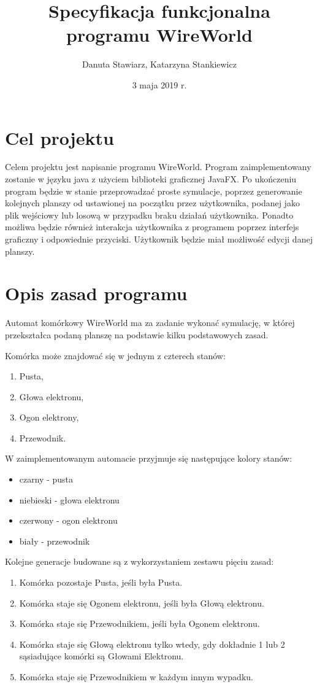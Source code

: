 \documentclass[10pt, oneside]{article}
\title{Specyfikacja funkcjonalna programu WireWorld}
\author{Danuta Stawiarz, Katarzyna Stankiewicz}
\date{3 maja 2019 r.}
\begin{document}
\maketitle
\tableofcontents
\newpage	

\section{Cel projektu}

Celem projektu jest napisanie programu WireWorld. Program zaimplementowany zostanie w języku java z użyciem biblioteki graficznej JavaFX. Po ukończeniu program będzie w stanie przeprowadzać proste symulacje, poprzez generowanie kolejnych planszy od ustawionej na początku przez użytkownika, podanej jako plik wejściowy lub losową w przypadku braku działań użytkownika. Ponadto możliwa będzie również interakcja użytkownika z programem poprzez interfejs graficzny i odpowiednie przyciski. Użytkownik będzie miał możliwość edycji danej planszy. 

\section{Opis zasad programu}

Automat komórkowy WireWorld ma za zadanie wykonać symulację, w której przekształca podaną planszę na podstawie kilku podstawowych zasad.

 Komórka może znajdować się w jednym z czterech stanów:

\begin{enumerate}
\item Pusta,
\item Głowa elektronu,
\item Ogon elektrony,
\item Przewodnik.
\end{enumerate}

W zaimplementowanym automacie przyjmuje się następujące kolory stanów:
\begin{itemize}
\item czarny - pusta
\item niebieski - głowa elektronu
\item czerwony - ogon elektronu
\item biały - przewodnik
\end{itemize}


Kolejne generacje budowane są z wykorzystaniem zestawu pięciu zasad:
\begin{enumerate}
\item Komórka pozostaje Pusta, jeśli była Pusta.
\item Komórka staje się Ogonem elektronu, jeśli była Głową elektronu.
\item Komórka staje się Przewodnikiem, jeśli była Ogonem elektronu.
\item Komórka staje się Głową elektronu tylko wtedy, gdy dokładnie 1 lub 2 sąsiadujące komórki są Głowami Elektronu.
\item Komórka staje się Przewodnikiem w każdym innym wypadku.
\end{enumerate}
\end{document}
